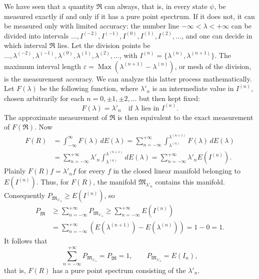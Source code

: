 \documentclass[fontsize=13pt,twoside,openany,headings=normal,parskip=false,bookmarkpackage=false,DIV=calc]{scrbook}
\begin{document}
We have seen that a quantity $\mathfrak R$ can always, that is, in every state $\psi$, be measured exactly if and only if it has a pure point spectrum. If it does not, it can be measured only with limited accuracy: the number line $-\infty<\lambda<+\infty$ can be divided into intervals $\ldots,I^{(-2)},I^{(-1)},I^{(0)},I^{(1)},I^{(2)},\ldots$, and one can decide in which interval $\mathfrak R$ lies. Let the division points be $\ldots,\lambda^{(-2)},\lambda^{(-1)},\lambda^{(0)},\lambda^{(1)},\lambda^{(2)},\ldots$, with $I^{(n)}=\{\lambda^{(n)},\lambda^{(n+1)}\}$. The maximum interval length $\varepsilon=\operatorname{Max}(\lambda^{(n+1)}-\lambda^{(n)})$, or mesh of the division, is the measurement accuracy. We can analyze this latter process mathematically. Let $F(\lambda)$ be the following function, where $\lambda'_n$ is an intermediate value in $I^{(n)}$, chosen arbitrarily for each $n=0,\pm1,\pm2,\ldots$ but then kept fixed:
\[
F(\lambda)=\lambda'_n\quad\text{if }\lambda\text{ lies in }I^{(n)}.
\]
The approximate measurement of $\mathfrak R$ is then equivalent to the exact measurement of $F(\mathfrak R)$. Now
\begin{align*}
F(R)&=\int_{-\infty}^{\infty}F(\lambda)\,dE(\lambda)
=\sum_{n=-\infty}^{+\infty}\int_{\lambda^{(n)}}^{\lambda^{(n+1)}}F(\lambda)\,dE(\lambda)\\
&=\sum_{n=-\infty}^{+\infty}\lambda'_n\int_{\lambda^{(n)}}^{\lambda^{(n+1)}}dE(\lambda)
=\sum_{n=-\infty}^{+\infty}\lambda'_nE(I^{(n)}).
\end{align*}
\hypertarget{origpage-116}{}%
Plainly $F(R)f=\lambda'_nf$ for every $f$ in the closed linear manifold belonging to $E(I^{(n)})$. Thus, for $F(R)$, the manifold $\mathfrak M_{\lambda'_n}$ contains this manifold. Consequently $P_{\mathfrak M_{\lambda'_n}}\ge E(I^{(n)})$, so
\begin{align*}
P_{\overline{\mathfrak M}}
&\ge\sum_{n=-\infty}^{+\infty}P_{\mathfrak M_{\lambda'_n}}
\ge\sum_{n=-\infty}^{+\infty}E(I^{(n)})\\
&=\sum_{n=-\infty}^{+\infty}(E(\lambda^{(n+1)})-E(\lambda^{(n)}))=1-0=1.
\end{align*}
It follows that
\[
\sum_{n=-\infty}^{+\infty}P_{\mathfrak M_{\lambda'_n}}=P_{\overline{\mathfrak M}}=1,
\qquad P_{\mathfrak M_{\lambda'_n}}=E(I_n),
\]
that is, $F(R)$ has a pure point spectrum consisting of the $\lambda'_n$.
\end{document}
